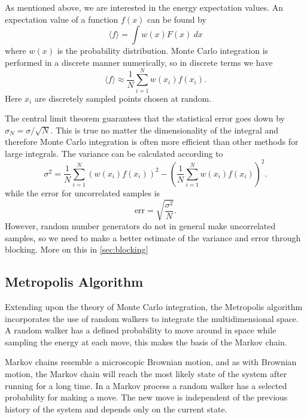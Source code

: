 \documentclass[aps,prb,twocolumn,floatfix]{revtex4}
\begin{document}
As mentioned above, we are interested in the energy expectation values. An expectation value of a function $f(x)$ can be found by
\begin{equation}
    \langle f \rangle = \int w(x) F(x) ~dx
\end{equation} 
where $w(x)$ is the probability distribution. Monte Carlo integration is performed in a discrete manner numerically, so in discrete terms we have
\begin{equation}
    \langle f \rangle \approx \frac{1}{N} \sum_{i=1}^{N} w(x_i) f(x_i).
\end{equation}
Here $x_i$ are discretely sampled points chosen at random.

The central limit theorem guarantees that the statistical error goes down by $\sigma_N = \sigma/\sqrt{N}$. This is true no matter the dimensionality of the integral and therefore Monte Carlo integration is often more efficient than other methods for large integrals. The variance can be calculated according to
\begin{equation}
\sigma^2 = \frac{1}N \sum_{i=1}^N \left( w(x_i) f(x_i) \right)^2 - \left ( \frac{1}{N} \sum_{i=1}^N w(x_i) f(x_i) \right )^2.
\end{equation}
while the error for uncorrelated samples is
\begin{equation}
    \text{err} = \sqrt{\frac{\sigma^2}{N}}.
\end{equation}
However, random number generators do not in general make uncorrelated samples, so we need to make a better estimate of the variance and error through blocking. More on this in \ref{sec:blocking}

\subsection{Metropolis Algorithm}

Extending upon the theory of Monte Carlo integration, the Metropolis algorithm incorporates the use of random walkers to integrate the multidimensional space. A random walker has a defined probability to move around in space while sampling the energy at each move, this makes the basis of the Markov chain.

Markov chains resemble a microscopic Brownian motion, and as with Brownian motion, the Markov chain will reach the most likely state of the system after running for a long time. In a Markov process a random walker has a selected probability for making a move. The new move is independent of the previous history of the system and depends only on the current state.
\end{document}
